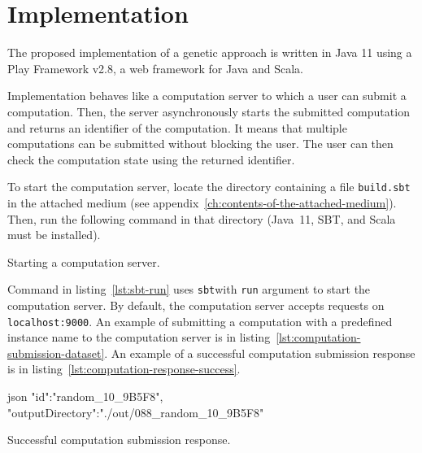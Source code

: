 \clearpage%
\newpage


\section{Implementation}\label{sec:implementation}

The proposed implementation of a genetic approach is written in Java 11
using a Play Framework v2.8\footnotemark[1], a web framework for Java and Scala.

Implementation behaves like a computation server to which
a user can submit a computation.
Then, the server asynchronously starts the submitted computation and returns an identifier of the computation.
It means that multiple computations can be submitted without blocking the user.
The user can then check the computation state using the returned identifier.

To start the computation server, locate the directory containing a file \verb|build.sbt| in the attached medium (see appendix~\ref{ch:contents-of-the-attached-medium}).
Then, run the following command in that directory (Java~11, SBT\footnotemark[3], and Scala must be installed).

\begin{listing}[h!]
    \caption[Starting a computation server]
    {Starting a computation server.}
    \label{lst:sbt-run}
\end{listing}

Command in listing~\ref{lst:sbt-run} uses \verb|sbt|\footnotemark[3] with \verb|run| argument to start the computation server.
By default, the computation server accepts requests on \verb|localhost:9000|.
An example of submitting a computation with a predefined instance name to the computation server is in listing~\ref{lst:computation-submission-dataset}.
An example of a successful computation submission response is in listing~\ref{lst:computation-response-success}.

\begin{listing}[h!]
    \begin{cminted}[autogobble,breaklines=true]{json}
    {
        "id":"random_10_9B5F8",
        "outputDirectory":"./out/088_random_10_9B5F8"
    }
    \end{cminted}
    \caption[Successful computation submission response]
    {Successful computation submission response.}
    \label{lst:computation-response-success}
\end{listing}

